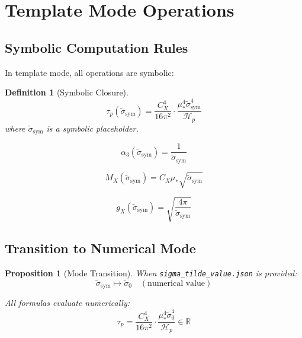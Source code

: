 \documentclass[11pt,letterpaper]{article}
\newtheorem{proposition}[theorem]{Proposition}
\newtheorem{definition}[theorem]{Definition}
\newcommand{\st}{\tilde{\sigma}}
\newcommand{\Hp}{\mathcal{H}_p}
\begin{document}
\section{Template Mode Operations}
\label{app:template-ops}

\subsection{Symbolic Computation Rules}
\label{app:symbolic}

In template mode, all operations are symbolic:

\begin{definition}[Symbolic Closure]
\label{def:symbolic-closure}
\begin{equation}
\tau_p(\st_{\text{sym}}) = \frac{C_X^4}{16\pi^2} \cdot \frac{\mu_*^4 \st_{\text{sym}}^4}{\Hp}
\label{eq:symbolic-taup}
\end{equation}
where $\st_{\text{sym}}$ is a symbolic placeholder.
\end{definition}

\begin{equation}
\alpha_3(\st_{\text{sym}}) = \frac{1}{\st_{\text{sym}}}
\label{eq:symbolic-alpha3}
\end{equation}

\begin{equation}
M_X(\st_{\text{sym}}) = C_X \mu_* \sqrt{\st_{\text{sym}}}
\label{eq:symbolic-mx}
\end{equation}

\begin{equation}
g_X(\st_{\text{sym}}) = \sqrt{\frac{4\pi}{\st_{\text{sym}}}}
\label{eq:symbolic-gx}
\end{equation}

\subsection{Transition to Numerical Mode}
\label{app:transition}

\begin{proposition}[Mode Transition]
\label{prop:mode-transition}
When \texttt{sigma\_tilde\_value.json} is provided:
\begin{equation}
\st_{\text{sym}} \mapsto \st_0 \quad (\text{numerical value})
\label{eq:mode-transition}
\end{equation}

All formulas evaluate numerically:
\begin{equation}
\tau_p = \frac{C_X^4}{16\pi^2} \cdot \frac{\mu_*^4 \st_0^4}{\Hp} \in \mathbb{R}
\label{eq:numerical-taup}
\end{equation}
\end{proposition}
\end{document}
